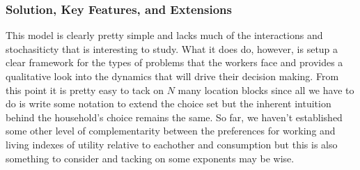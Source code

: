 \documentclass[11pt,english]{article}
\begin{document}
\subsubsection{Solution, Key Features, and Extensions}

This model is clearly pretty simple and lacks much of the interactions and stochasiticty that is interesting to study. What it does do, however, is setup a clear framework for the types of problems that the workers face and provides a qualitative look into the dynamics that will drive their decision making. From this point it is pretty easy to tack on $N$ many location blocks since all we have to do is write some notation to extend the choice set but the inherent intuition behind the household's choice remains the same. So far, we haven't established some other level of complementarity between the preferences for working and living indexes of utility relative to eachother and consumption but this is also something to consider and tacking on some exponents may be wise. \\
\end{document}
